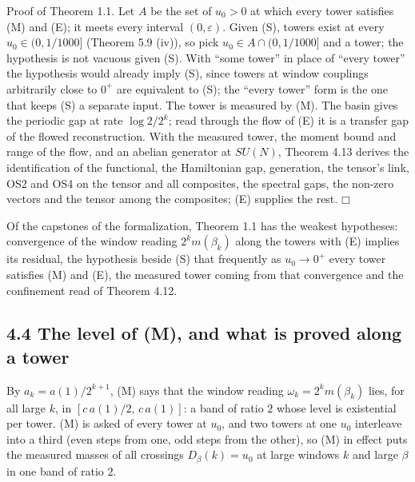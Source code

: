 \documentclass[10pt,letterpaper,twocolumn]{article}
\providecommand{\square}{\mdlgwhtsquare}\providecommand{\Box}{\mdlgwhtsquare}%
\begin{document}
Proof of Theorem 1.1. Let \(A\) be the set of \(u_0>0\) at which every tower satisfies (M) and (E); it meets every interval \((0,\varepsilon)\). Given (S), towers exist at every \(u_0\in(0,1/1000]\) (Theorem 5.9 (iv)), so pick \(u_0\in A\cap(0,1/1000]\) and a tower; the hypothesis is not vacuous given (S). With ``some tower'' in place of ``every tower'' the hypothesis would already imply (S), since towers at window couplings arbitrarily close to \(0^+\) are equivalent to (S); the ``every tower'' form is the one that keeps (S) a separate input. The tower is measured by (M). The basin gives the periodic gap at rate \(\log2/2^k\); read through the flow of (E) it is a transfer gap of the flowed reconstruction. With the measured tower, the moment bound and range of the flow, and an abelian generator at \(SU(N)\), Theorem 4.13 derives the identification of the functional, the Hamiltonian gap, generation, the tensor's link, OS2 and OS4 on the tensor and all composites, the spectral gaps, the non-zero vectors and the tensor among the composites; (E) supplies the rest. \(\square\)

Of the capstones of the formalization, Theorem 1.1 has the weakest hypotheses: convergence of the window reading \(2^km(\beta_k)\) along the towers with (E) implies its residual, the hypothesis beside (S) that frequently as \(u_0\to0^+\) every tower satisfies (M) and (E), the measured tower coming from that convergence and the confinement read of Theorem 4.12.

\subsection{4.4 The level of (M), and what is proved along a tower}\label{44-the-level-of-m-and-what-is-proved-along-a-tower}

By \(a_k=a(1)/2^{k+1}\), (M) says that the window reading \(\omega_k=2^km(\beta_k)\) lies, for all large \(k\), in \([c\,a(1)/2,\,c\,a(1)]\): a band of ratio \(2\) whose level is existential per tower. (M) is asked of every tower at \(u_0\), and two towers at one \(u_0\) interleave into a third (even steps from one, odd steps from the other), so (M) in effect puts the measured masses of all crossings \(D_\beta(k)=u_0\) at large windows \(k\) and large \(\beta\) in one band of ratio \(2\).
\end{document}
